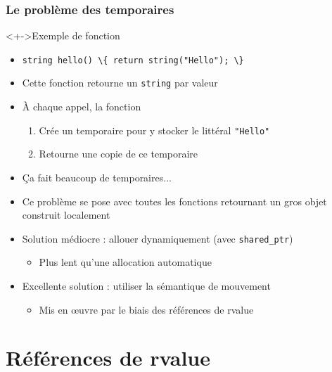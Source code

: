 \begin{frame}
\frametitle{Le problème des temporaires}
\begin{exampleblock}<+->{Exemple de fonction}
	\begin{itemize}
	\item \lstinline|string hello() \{ return string("Hello"); \}|
	\end{itemize}
\end{exampleblock}
\begin{itemize}[<+->]
\item Cette fonction retourne un \texttt{string} par valeur
\item À chaque appel, la fonction
	\begin{enumerate}
	\item Crée un temporaire pour y stocker le littéral \lstinline|"Hello"|
	\item Retourne une copie de ce temporaire
	\end{enumerate}
\item Ça fait beaucoup de temporaires...
\item Ce problème se pose avec toutes les fonctions retournant un gros objet construit localement
\item Solution médiocre : allouer dynamiquement (avec \lstinline|shared_ptr|)
	\begin{itemize}
	\item Plus lent qu'une allocation automatique
	\end{itemize}
\item Excellente solution : utiliser la sémantique de mouvement
	\begin{itemize}
	\item Mis en œuvre par le biais des références de rvalue
	\end{itemize}
\end{itemize}
\end{frame}

\section{Références de rvalue}

